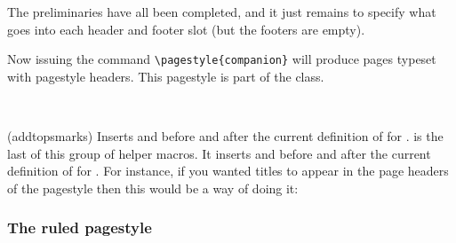     The preliminaries have all been completed, and it just remains to specify
what goes into each header and footer slot 
(but the footers are empty).
\begin{lcode}
%
  {\normalfont\bfseries\thepage}{}{%
   \normalfont\bfseries\leftmark}
%
  {\normalfont\bfseries\rightmark}{}{%
   \normalfont\bfseries\thepage}
\end{lcode}

    Now issuing the command \verb?\pagestyle{companion}? will produce pages 
typeset with  pagestyle headers. This pagestyle
is part of the class.

\begin{syntax}
\cmd{\addtopsmarks} \\
\end{syntax}
\glossary(addtopsmarks)%
  {}%
  {Inserts  and  before and after the current
   definition of  for .}
\cmd{\addtopsmarks} is the last
of this group of helper macros. It inserts  and  
before and after the current definition of  
for . For instance, if you wanted  titles to appear
in the page headers of the  pagestyle then this would be a way
of doing it:
\begin{lcode}
\end{lcode}


\subsubsection{The ruled pagestyle}

